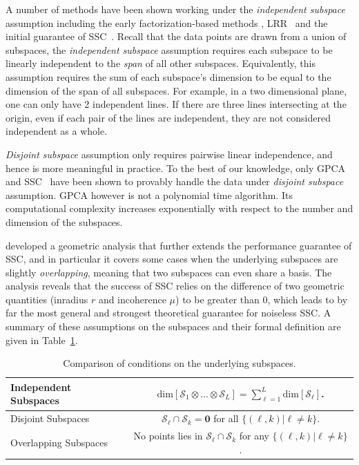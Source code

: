 \documentclass[twoside,11pt]{article}
\numberwithin{equation}{section}
\def\dim{\mathrm{dim}}
\def\cS{\mathcal{S}}
\begin{document}
A number of methods have been shown working under the \emph{independent subspace} assumption including the early factorization-based methods \citep{costeira1998motion_seg,kanatani2001motion}, LRR~\citep{liu2010lrr_icml} and the initial guarantee of SSC~\citep{elhamifar2009ssc}. Recall that the data points are drawn from a union of subspaces, the \emph{independent subspace } assumption requires each subspace to be linearly independent to the {\em span} of all other subspaces. Equivalently, this assumption requires the sum of each subspace's dimension to be equal to the dimension of the span of all subspaces. For example, in a two dimensional plane, one can only have 2 independent lines. If there are three lines intersecting at the origin, even if each pair of the lines are independent, they are not considered independent as a whole.

\emph{Disjoint subspace} assumption only requires pairwise linear independence, and hence is more meaningful in practice. To the best of our knowledge, only GPCA~\citep{vidal2005gpca} and SSC~\citep{elhamifar2010ssc_icassp,elhamifar2012ssc_journal} have been shown to provably handle the data under \emph{disjoint subspace} assumption. GPCA however is not a polynomial time algorithm. Its computational complexity increases exponentially with respect to the number and dimension of the subspaces.

\citet{soltanolkotabi2011geometric} developed a geometric analysis that further extends the performance guarantee of SSC, and in particular it covers some cases when the underlying subspaces are slightly \emph{overlapping}, meaning that two subspaces can even share a basis. The analysis reveals that the success of SSC relies on the difference of two geometric quantities (inradius $r$ and incoherence $\mu$) to be greater than $0$, which leads to by far the most general and strongest theoretical guarantee for noiseless SSC. A summary of these assumptions on the subspaces and their formal definition are given in Table~\ref{tab:subspaces}.
\begin{table}
  \centering
\begin{tabular}{|l|c|}
  \hline
  Independent Subspaces & $\dim\left[\cS_1\otimes...\otimes \cS_L\right] = \sum_{\ell=1}^L \dim\left[\cS_\ell\right]  $.  \\\hline
  Disjoint Subspaces &  $\cS_\ell\cap \cS_k =\mathbf{0}$ for all $\{(\ell,k)|\ell\neq k\}$.\\\hline
  Overlapping Subspaces & No points lies in $\cS_\ell\cap \cS_k$ for any $\{(\ell,k)|\ell\neq k\}$.\\
  \hline
\end{tabular}
\caption{Comparison of conditions on the underlying subspaces.}\label{tab:subspaces}
\end{table}
\end{document}
